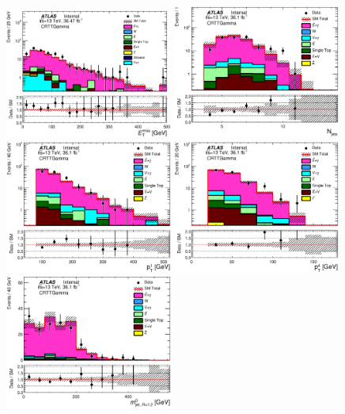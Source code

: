 \begin{figure}[h!]
\begin{center}
\includegraphics[width=0.49\textwidth]{figures/ttGamma/Met_CRTTGamma_withRatio_log.eps}
\includegraphics[width=0.49\textwidth]{figures/ttGamma/postfit/NJets_CRTTGamma_log.eps}
\includegraphics[width=0.49\textwidth]{figures/ttGamma/postfit/JetPt_1__CRTTGamma_log.eps}
\includegraphics[width=0.49\textwidth]{figures/ttGamma/postfit/JetPt_4__CRTTGamma_log.eps}
\includegraphics[width=0.49\textwidth]{figures/ttGamma/postfit/AntiKt12M_0__CRTTGamma.eps}

\end{center}
\end{figure}
